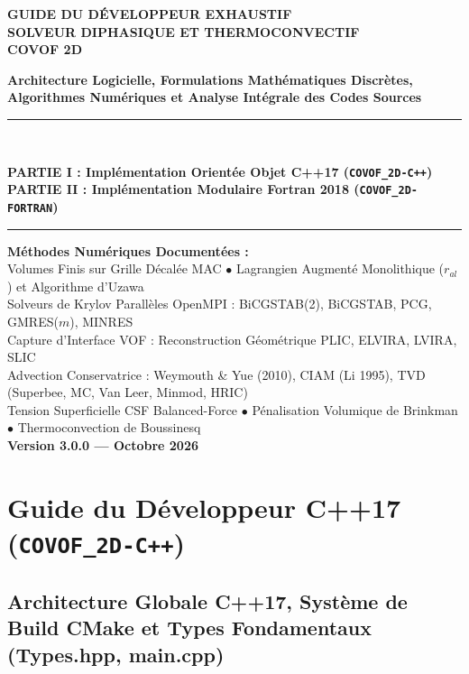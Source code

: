 \documentclass[10pt,a4paper,oneside]{book}
\begin{document}
\begin{titlepage}
\centering
\vspace*{2cm}
{\Huge\bfseries GUIDE DU DÉVELOPPEUR EXHAUSTIF\\[0.4cm] SOLVEUR DIPHASIQUE ET THERMOCONVECTIF\\[0.4cm] COVOF 2D\par}
\vspace{1cm}
{\Large\bfseries Architecture Logicielle, Formulations Mathématiques Discrètes, Algorithmes Numériques et Analyse Intégrale des Codes Sources\par}
\vspace{1.2cm}
\rule{\textwidth}{1.5pt}\\[0.5cm]
{\LARGE\bfseries PARTIE I : Implémentation Orientée Objet C++17 (\texttt{COVOF\_2D-C++})\\[0.3cm]
PARTIE II : Implémentation Modulaire Fortran 2018 (\texttt{COVOF\_2D-FORTRAN})\par}
\vspace{0.3cm}
\rule{\textwidth}{1.5pt}
\vfill
{\large
\textbf{Méthodes Numériques Documentées :}\\
Volumes Finis sur Grille Décalée MAC $\bullet$ Lagrangien Augmenté Monolithique ($r_{al}$) et Algorithme d'Uzawa\\
Solveurs de Krylov Parallèles OpenMPI : BiCGSTAB(2), BiCGSTAB, PCG, GMRES($m$), MINRES\\
Capture d'Interface VOF : Reconstruction Géométrique PLIC, ELVIRA, LVIRA, SLIC\\
Advection Conservatrice : Weymouth \& Yue (2010), CIAM (Li 1995), TVD (Superbee, MC, Van Leer, Minmod, HRIC)\\
Tension Superficielle CSF Balanced-Force $\bullet$ Pénalisation Volumique de Brinkman $\bullet$ Thermoconvection de Boussinesq\\[1cm]
\textbf{Version 3.0.0 — Octobre 2026}
}
\end{titlepage}

\tableofcontents
\cleardoublepage
\part{Guide du Développeur C++17 (\texttt{COVOF\_2D-C++})}
\chapter{Architecture Globale C++17, Système de Build CMake et Types Fondamentaux (Types.hpp, main.cpp)}
\end{document}
